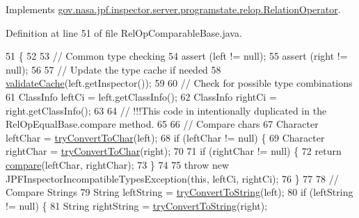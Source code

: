 Implements \hyperlink{interfacegov_1_1nasa_1_1jpf_1_1inspector_1_1server_1_1programstate_1_1relop_1_1_relation_operator_ad35e4918d8de2de096c7d8035352a3ec}{gov.\+nasa.\+jpf.\+inspector.\+server.\+programstate.\+relop.\+Relation\+Operator}.



Definition at line 51 of file Rel\+Op\+Comparable\+Base.\+java.


\begin{DoxyCode}
51                                                                                                            
                                        \{
52 
53     \textcolor{comment}{// Common type checking}
54     assert (left != null);
55     assert (right != null);
56 
57     \textcolor{comment}{// Update the type cache if needed}
58     \hyperlink{classgov_1_1nasa_1_1jpf_1_1inspector_1_1server_1_1programstate_1_1relop_1_1_rel_op_comparable_base_a7e8b465bb4002c1759b6096f9e2eecbf}{validateCache}(left.getInspector());
59 
60     \textcolor{comment}{// Check for possible type combinations}
61     ClassInfo leftCi = left.getClassInfo();
62     ClassInfo rightCi = right.getClassInfo();
63 
64     \textcolor{comment}{// !!!This code in intentionally duplicated in the RelOpEqualBase.compare method.}
65 
66     \textcolor{comment}{// Compare chars}
67     Character leftChar = \hyperlink{classgov_1_1nasa_1_1jpf_1_1inspector_1_1server_1_1programstate_1_1relop_1_1_rel_op_comparable_base_a1e3bca3adb8c3a790eaad60d9adf5c47}{tryConvertToChar}(left);
68     \textcolor{keywordflow}{if} (leftChar != null) \{
69       Character rightChar = \hyperlink{classgov_1_1nasa_1_1jpf_1_1inspector_1_1server_1_1programstate_1_1relop_1_1_rel_op_comparable_base_a1e3bca3adb8c3a790eaad60d9adf5c47}{tryConvertToChar}(right);
70 
71       \textcolor{keywordflow}{if} (rightChar != null) \{
72         \textcolor{keywordflow}{return} \hyperlink{classgov_1_1nasa_1_1jpf_1_1inspector_1_1server_1_1programstate_1_1relop_1_1_rel_op_comparable_base_a8b752e9df78b668d5b917c6285225d81}{compare}(leftChar, rightChar);
73       \}
74 
75       \textcolor{keywordflow}{throw} \textcolor{keyword}{new} JPFInspectorIncompatibleTypesException(\textcolor{keyword}{this}, leftCi, rightCi);
76     \}
77 
78     \textcolor{comment}{// Compare Strings}
79     String leftString = \hyperlink{classgov_1_1nasa_1_1jpf_1_1inspector_1_1server_1_1programstate_1_1relop_1_1_rel_op_comparable_base_aa1b564784dad5abf5565f080fe1a3a9f}{tryConvertToString}(left);
80     \textcolor{keywordflow}{if} (leftString != null) \{
81       String rightString = \hyperlink{classgov_1_1nasa_1_1jpf_1_1inspector_1_1server_1_1programstate_1_1relop_1_1_rel_op_comparable_base_aa1b564784dad5abf5565f080fe1a3a9f}{tryConvertToString}(right);

\end{DoxyCode}
